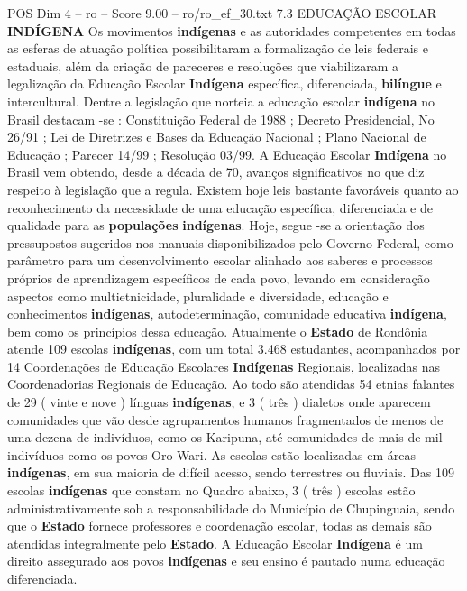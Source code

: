 \begin{textsample}{POS Dim 4 – ro – Score 9.00 – ro/ro\_ef\_30.txt}  \label{ex:f4_pos_218}
7.3 EDUCAÇÃO ESCOLAR \textbf{INDÍGENA} Os movimentos \textbf{indígenas} e as autoridades competentes em todas as esferas de atuação política possibilitaram a formalização de leis federais e estaduais, além da criação de pareceres e resoluções que viabilizaram a legalização da Educação Escolar \textbf{Indígena} específica, diferenciada, \textbf{bilíngue} e intercultural.
Dentre a legislação que norteia a educação escolar \textbf{indígena} no Brasil destacam -se : Constituição Federal de 1988 ; Decreto Presidencial, No 26/91 ; Lei de Diretrizes e Bases da Educação Nacional ; Plano Nacional de Educação ; Parecer 14/99 ; Resolução 03/99.
A Educação Escolar \textbf{Indígena} no Brasil vem obtendo, desde a década de 70, avanços significativos no que diz respeito à legislação que a regula.
Existem hoje leis bastante favoráveis quanto ao reconhecimento da necessidade de uma educação específica, diferenciada e de qualidade para as \textbf{populações} \textbf{indígenas}.
Hoje, segue -se a orientação dos pressupostos sugeridos nos manuais disponibilizados pelo Governo Federal, como parâmetro para um desenvolvimento escolar alinhado aos saberes e processos próprios de aprendizagem específicos de cada povo, levando em consideração aspectos como multietnicidade, pluralidade e diversidade, educação e conhecimentos \textbf{indígenas}, autodeterminação, comunidade educativa \textbf{indígena}, bem como os princípios dessa educação.
Atualmente o \textbf{Estado} de Rondônia atende 109 escolas \textbf{indígenas}, com um total 3.468 estudantes, acompanhados por 14 Coordenações de Educação Escolares \textbf{Indígenas} Regionais, localizadas nas Coordenadorias Regionais de Educação.
Ao todo são atendidas 54 etnias falantes de 29 ( vinte e nove ) línguas \textbf{indígenas}, e 3 ( três ) dialetos onde aparecem comunidades que vão desde agrupamentos humanos fragmentados de menos de uma dezena de indivíduos, como os Karipuna, até comunidades de mais de mil indivíduos como os povos Oro Wari.
As escolas estão localizadas em áreas \textbf{indígenas}, em sua maioria de difícil acesso, sendo terrestres ou fluviais.
Das 109 escolas \textbf{indígenas} que constam no Quadro abaixo, 3 ( três ) escolas estão administrativamente sob a responsabilidade do Município de Chupinguaia, sendo que o \textbf{Estado} fornece professores e coordenação escolar, todas as demais são atendidas integralmente pelo \textbf{Estado}.
A Educação Escolar \textbf{Indígena} é um direito assegurado aos povos \textbf{indígenas} e seu ensino é pautado numa educação diferenciada.

\end{textsample}
